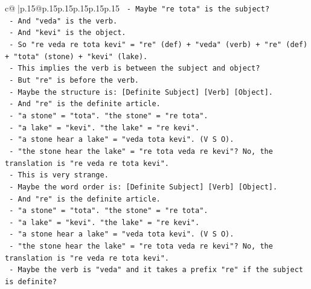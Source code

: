 \documentclass{article}
\begin{document}
{\begin{supertabular}{c@{$\;$}|p{.15\linewidth}@{}p{.15\linewidth}p{.15\linewidth}p{.15\linewidth}p{.15\linewidth}p{.15\linewidth}}
{{{\texttt{                           {-} Maybe "re tota" is the subject?} \\
\texttt{                           {-} And "veda" is the verb.} \\
\texttt{                           {-} And "kevi" is the object.} \\
\texttt{                           {-} So "re veda re tota kevi" = "re" (def) + "veda" (verb) + "re" (def) + "tota" (stone) + "kevi" (lake).} \\
\texttt{                           {-} This implies the verb is between the subject and object?} \\
\texttt{                           {-} But "re" is before the verb.} \\
\texttt{                           {-} Maybe the structure is: {[}Definite Subject{]} {[}Verb{]} {[}Object{]}.} \\
\texttt{                           {-} And "re" is the definite article.} \\
\texttt{                           {-} "a stone" = "tota". "the stone" = "re tota".} \\
\texttt{                           {-} "a lake" = "kevi". "the lake" = "re kevi".} \\
\texttt{                           {-} "a stone hear a lake" = "veda tota kevi". (V S O).} \\
\texttt{                           {-} "the stone hear the lake" = "re tota veda re kevi"? No, the translation is "re veda re tota kevi".} \\
\texttt{                           {-} This is very strange.} \\
\texttt{                           {-} Maybe the word order is: {[}Definite Subject{]} {[}Verb{]} {[}Object{]}.} \\
\texttt{                           {-} And "re" is the definite article.} \\
\texttt{                           {-} "a stone" = "tota". "the stone" = "re tota".} \\
\texttt{                           {-} "a lake" = "kevi". "the lake" = "re kevi".} \\
\texttt{                           {-} "a stone hear a lake" = "veda tota kevi". (V S O).} \\
\texttt{                           {-} "the stone hear the lake" = "re tota veda re kevi"? No, the translation is "re veda re tota kevi".} \\
\texttt{                           {-} Maybe the verb is "veda" and it takes a prefix "re" if the subject is definite?} \\
}}}
\end{supertabular}}
\end{document}
